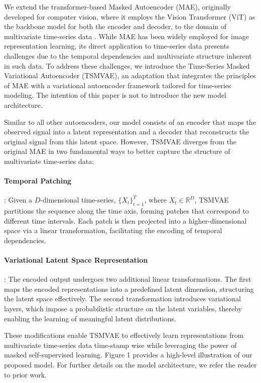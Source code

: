 \documentclass[12pt]{article} %
\newcommand{\para}[1]{\vspace*{-4.5mm}\paragraph{#1}}
\begin{document}
We extend the transformer-based Masked Autoencoder (MAE), originally developed for computer vision, where it employs the Vision Transformer (ViT) as the backbone model for both the encoder and decoder, to the domain of multivariate time-series data \citep{dosovitskiy2020image, he2022masked}. While MAE has been widely employed for image representation learning, its direct application to time-series data presents challenges due to the temporal dependencies and multivariate structure inherent in such data. To address these challenges, we introduce the Time-Series Masked Variational Autoencoder (TSMVAE), an adaptation that integrates the principles of MAE with a variational autoencoder framework tailored for time-series modeling. The intention of this paper is not to introduce the new model architecture.

Similar to all other autoencoders, our model consists of an encoder that maps the observed signal into a latent representation and a decoder that reconstructs the original signal from this latent space. However, TSMVAE diverges from the original MAE in two fundamental ways to better capture the structure of multivariate time-series data:

\para{Temporal Patching}: Given a $D$-dimensional time-series, $\{X_t\}_{t=1}^{T}$, where $X_t \in \mathbb{R}^D$, TSMVAE partitions the sequence along the time axis, forming patches that correspond to different time intervals. Each patch is then projected into a higher-dimensional space via a linear transformation, facilitating the encoding of temporal dependencies.

\para{Variational Latent Space Representation}: The encoded output undergoes two additional linear transformations. The first maps the encoded representations into a predefined latent dimension, structuring the latent space effectively. The second transformation introduces variational layers, which impose a probabilistic structure on the latent variables, thereby enabling the learning of meaningful latent distributions. 

These modifications enable TSMVAE to effectively learn representations from multivariate time-series data time-stamp wise while leveraging the power of masked self-supervised learning. Figure 1 provides a high-level illustration of our proposed model. For further details on the model architecture, we refer the reader to prior work.
\end{document}
